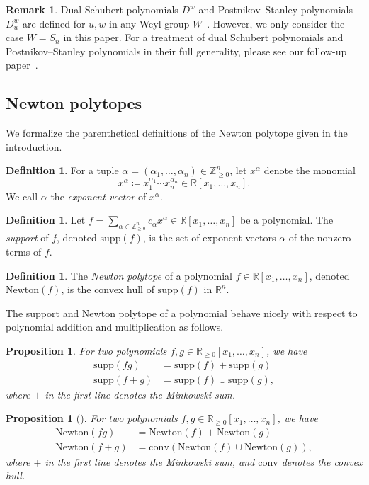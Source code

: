 \documentclass[11pt]{article}
\newtheorem{prop}[theo]{Proposition}
\theoremstyle{definition}
\newtheorem{defi}[theo]{Definition}
\newtheorem{rema}[theo]{Remark}
\numberwithin{equation}{section}
\newcommand{\conv}{\mathrm{conv}}
\newcommand{\Newton}{\mathrm{Newton}}
\newcommand{\R}{\mathbb{R}}
\newcommand{\supp}{\mathrm{supp}}
\newcommand{\ZZ}{\mathbb{Z}}
\newcommand{\ZZZ}{\mathbb{Z}_{\ge 0}}
\begin{document}
\begin{rema}
    Dual Schubert polynomials $D^w$ and Postnikov--Stanley polynomials $D_u^w$ are defined for $u,w$ in any Weyl group $W$~\cite{PostnikovStanley}. However, we only consider the case $W = S_n$ in this paper. For a treatment of dual Schubert polynomials and Postnikov--Stanley polynomials in their full generality, please see our follow-up paper~\cite{PSLorentzian}.
\end{rema}

\subsection{Newton polytopes}
We formalize the parenthetical definitions of the Newton polytope given in the introduction. 

\begin{defi}\label{def:expvector}
    For a tuple $\alpha = (\alpha_1, \dots, \alpha_n)\in \ZZ_{\ge 0}^n$, let $x^\alpha$ denote the monomial 
    \[x^\alpha \coloneqq x_1^{\alpha_1}\cdots x_n^{\alpha_n}\in \R[x_1, \dots, x_n].\]
    We call $\alpha$ the \emph{exponent vector} of $x^{\alpha}$.
\end{defi}

\begin{defi}\label{def:supp}
Let $f = \sum_{\alpha \in \ZZZ^{n}} c_{\alpha} x^{\alpha} \in \R[x_{1}, \ldots, x_{n}]$ be a polynomial. 
    The \emph{support} of $f$, denoted $\supp(f)$, is the set of exponent vectors $\alpha$ of the nonzero terms of $f$.
\end{defi}
\begin{defi}\label{def:newton}
    The \emph{Newton polytope} of a polynomial $f\in \R[x_1, \dots, x_n]$, denoted $\Newton(f)$, is the convex hull of $\supp(f)$ in $\mathbb{R}^n$.
\end{defi}

The support and Newton polytope of a polynomial behave nicely with respect to polynomial addition and multiplication as follows. 
\begin{prop}\label{prop:suppsumprod}
    For two polynomials $f, g\in\R_{\ge 0}[x_1, \dots, x_n]$, we have 
    \begin{align*}
        \supp(fg) &=\supp(f)+\supp(g)\\
        \supp(f+g) &=\supp(f)\cup\supp(g),
    \end{align*}
     where $+$ in the first line denotes the Minkowski sum.
\end{prop}

\begin{prop}[\cite{NewtonPolyinAC}]\label{prop:Newtonsumprod}
    For two polynomials $f, g\in\R_{\ge 0}[x_1, \dots, x_n]$, we have 
    \begin{align*}
        \Newton(fg) &=\Newton(f)+\Newton(g)\\
        \Newton(f+g) &=\conv(\Newton(f)\cup\Newton(g)),
    \end{align*}
     where $+$ in the first line denotes the Minkowski sum, and $\conv$ denotes the convex hull.
\end{prop}
\end{document}
